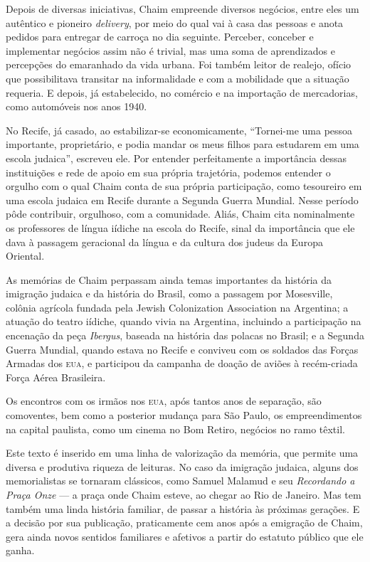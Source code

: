 Depois de diversas iniciativas, Chaim empreende diversos negócios, entre
eles um autêntico e pioneiro \textit{delivery}, por meio do qual
vai à casa das pessoas e anota pedidos para entregar de carroça no
dia seguinte. Perceber, conceber e implementar negócios assim não é
trivial, mas uma soma de aprendizados e percepções do emaranhado da vida
urbana. Foi também leitor de realejo, ofício que possibilitava transitar na
informalidade e com a mobilidade que a situação requeria. E depois, já
estabelecido, no comércio e na importação de mercadorias, como
automóveis nos anos 1940.

No Recife, já casado, ao estabilizar-se economicamente, ``Tornei-me uma pessoa importante, proprietário, e podia mandar os meus filhos para estudarem em uma escola judaica'', escreveu ele. Por entender
perfeitamente a importância dessas instituições e rede de apoio em sua
própria trajetória, podemos entender o orgulho com o qual Chaim
conta de sua própria participação, como tesoureiro em uma escola judaica em Recife durante a
Segunda Guerra Mundial. Nesse período pôde contribuir, orgulhoso, com a
comunidade. Aliás, Chaim cita nominalmente os professores de língua
iídiche na escola do Recife, sinal da importância que ele dava à passagem
geracional da língua e da cultura dos judeus da Europa Oriental.

As memórias de Chaim perpassam ainda temas importantes da história da
imigração judaica e da história do Brasil, como a passagem por
Mosesville, colônia agrícola fundada pela Jewish Colonization
Association na Argentina; a atuação do teatro iídiche, quando vivia na
Argentina, incluindo a participação na encenação da peça \textit{Ibergus},
baseada na história das polacas no Brasil; e a Segunda Guerra Mundial,
quando estava no Recife e conviveu com os soldados das Forças Armadas
dos \textsc{eua}, e participou da campanha de doação de aviões à recém-criada
Força Aérea Brasileira.

Os encontros com os irmãos nos \textsc{eua}, após tantos anos de
separação, são comoventes, bem como a posterior mudança para São Paulo,
os empreendimentos na capital paulista, como um cinema no Bom
Retiro, negócios no ramo têxtil.%

Este texto é inserido em uma linha de valorização da memória, que permite uma diversa e produtiva riqueza de leituras. No caso da imigração judaica, alguns dos memorialistas se tornaram clássicos, como Samuel Malamud e seu \textit{Recordando a Praça Onze} --- a praça onde Chaim esteve, ao chegar ao Rio de Janeiro. Mas tem também uma linda história familiar, de passar a história  às próximas gerações. E a decisão por sua publicação, praticamente cem anos após a emigração de Chaim, gera ainda novos sentidos familiares e afetivos a partir do estatuto público que ele ganha.

